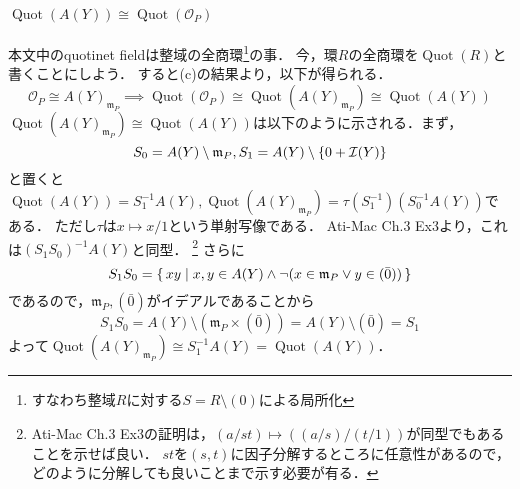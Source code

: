 \documentclass[a4paper]{jarticle}
\newcommand{\I}[1]{\mathfrak{#1}}
\newcommand{\Quot}{\operatorname{Quot}}
\begin{document}
    \paragraph{$\Quot(A(Y)) \cong \Quot(\mathcal{O}_P)$}
    本文中のquotinet fieldは整域の全商環\footnote{すなわち整域$R$に対する$S=R \setminus (0)$による局所化}の事．
    今，環$R$の全商環を$\Quot(R)$と書くことにしよう．
    すると(c)の結果より，以下が得られる．
    \[ \mathcal{O}_P \cong A(Y)_{\I{m}_P} \implies \Quot(\mathcal{O}_P) \cong \Quot(A(Y)_{\I{m}_P}) \cong \Quot(A(Y)) \]
    $\Quot(A(Y)_{\I{m}_P}) \cong \Quot(A(Y))$は以下のように示される．まず，
    \[ S_0=A(Y) \setminus \I{m}_P, S_1=A(Y) \setminus \{0+\defs(Y) \} \]
    と置くと$\Quot(A(Y))=S_1^{-1}A(Y), \Quot(A(Y)_{\I{m}_P})=\tau(S_1^{-1})(S_0^{-1}A(Y))$である．
    ただし$\tau$は$x \mapsto x/1$という単射写像である．
    Ati-Mac Ch.3 Ex3より，これは$(S_1 S_0)^{-1}A(Y)$と同型．
    \footnote
    {
        Ati-Mac Ch.3 Ex3の証明は，$(a/st) \mapsto ((a/s)/(t/1))$が同型でもあることを示せば良い．
        $st$を$(s,t)$に因子分解するところに任意性があるので，どのように分解しても良いことまで示す必要が有る．
    }
    さらに
    \[ S_1 S_0=\set{ xy | x,y \in A(Y) \land \lnot(x \in \I{m}_P \lor y \in (\bar{0})) } \]
    であるので，$\I{m}_P, (\bar{0})$がイデアルであることから
    \[ S_1 S_0=A(Y) \setminus (\I{m}_P \times (\bar{0}))=A(Y) \setminus (\bar{0})=S_1 \]
    よって$\Quot(A(Y)_{\I{m}_P}) \cong S_1^{-1}A(Y)=\Quot(A(Y))$．
\end{document}
